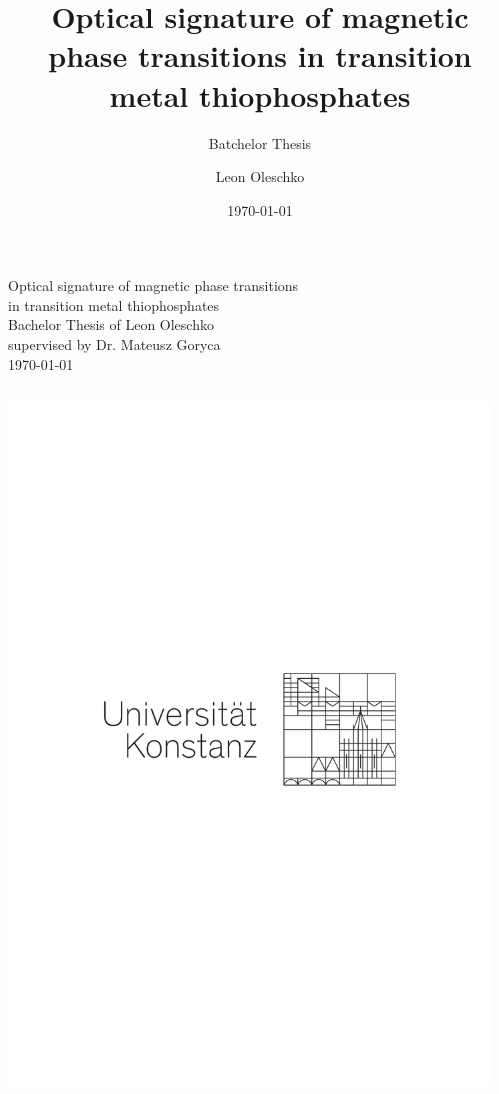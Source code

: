 \documentclass[
    aspectratio=169,
    12pt,
]{beamer}
\title{Optical signature of magnetic phase transitions in transition metal thiophosphates}
\subtitle{Batchelor Thesis}
\author{Leon Oleschko}
\date{\today}
\begin{document}
\begin{frame}
    \centering
    \Huge\color{seeblau}
    Optical signature of magnetic phase transitions\\ in transition metal thiophosphates
    \\\vspace{.5cm}
    \large \color{black}
    Bachelor Thesis of Leon Oleschko\\
    supervised by Dr. Mateusz Goryca
    \\
    \vspace{.5cm}
    \normalsize
    \today
    \vfill
    \begin{columns}
        \begin{column}{.3\textwidth}
            \centering
            \includegraphics[width=\textwidth]{../figures/logo/UniKonstanz_Logo.pdf}
        \end{column}
        \begin{column}{.3\textwidth}

\end{column}
\end{columns}
\end{frame}
\end{document}
